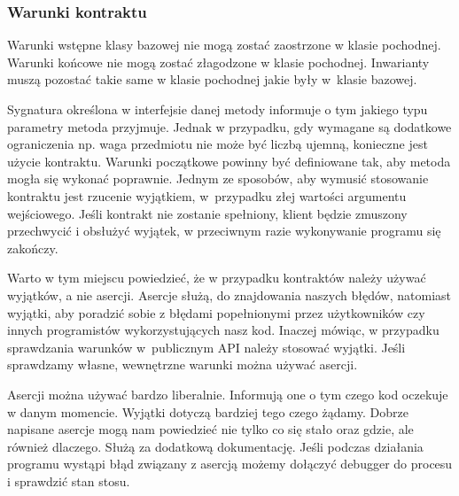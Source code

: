 \subsubsection{Warunki kontraktu}
Warunki wstępne klasy bazowej nie mogą zostać zaostrzone w klasie pochodnej. Warunki końcowe nie mogą zostać złagodzone w klasie pochodnej. Inwarianty muszą pozostać takie same w klasie pochodnej jakie były w~klasie bazowej.


Sygnatura określona w interfejsie danej metody informuje o tym jakiego typu parametry metoda przyjmuje. Jednak w przypadku, gdy wymagane są dodatkowe ograniczenia np. waga przedmiotu nie może być liczbą ujemną, konieczne jest użycie kontraktu. Warunki początkowe powinny być definiowane tak, aby metoda mogła się wykonać poprawnie. Jednym ze sposobów, aby wymusić stosowanie kontraktu jest rzucenie wyjątkiem, w~przypadku złej wartości argumentu wejściowego. Jeśli kontrakt nie zostanie spełniony, klient będzie zmuszony przechwycić i obsłużyć wyjątek, w przeciwnym razie wykonywanie programu się zakończy.

Warto w tym miejscu powiedzieć, że w przypadku kontraktów należy używać wyjątków, a nie asercji. Asercje służą, do znajdowania naszych błędów, natomiast wyjątki, aby poradzić sobie z błędami popełnionymi przez użytkowników czy innych programistów wykorzystujących nasz kod. Inaczej mówiąc, w przypadku sprawdzania warunków w~publicznym API należy stosować wyjątki. Jeśli sprawdzamy własne, wewnętrzne warunki można używać asercji.

Asercji można używać bardzo liberalnie. Informują one o tym czego kod oczekuje w danym momencie. Wyjątki dotyczą bardziej tego czego żądamy. Dobrze napisane asercje mogą nam powiedzieć nie tylko co się stało oraz gdzie, ale również dlaczego. Służą za dodatkową dokumentację. Jeśli podczas działania programu wystąpi błąd związany z asercją możemy dołączyć debugger do procesu i sprawdzić stan stosu. 

